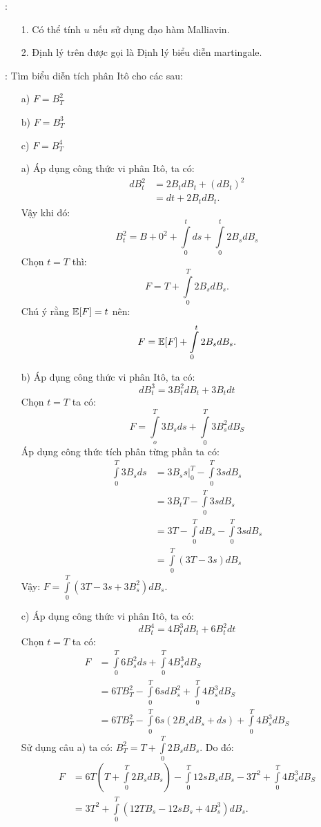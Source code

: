 \remarkname: 
\begin{itemize}
    \item[1.] Có thể tính $u$ nếu sử dụng đạo hàm Malliavin.
    \item[2.] Định lý trên được gọi là Định lý biểu diễn martingale. 
\end{itemize}
\examplename: Tìm biểu diễn tích phân Itô cho các \bnn sau:
\begin{itemize}
    \item[a)] $F =B_T^2$
    \item[b)] $F  = B_T^3$
    \item[c)] $F = B_T^4$ 
\end{itemize}
\begin{sol*}
    \begin{itemize}
        \item[a)] Áp dụng công thức vi phân Itô, ta có:
        \begin{align*}
            dB_t^2 &= 2B_t dB_t + (dB_t)^2 \\
            &= dt + 2B_t dB_t.
        \end{align*}
        Vậy khi đó: 
        \[B_t^2 = B+0^2 + \int\limits_0^t ds+ \int\limits_0^t 2B_s dB_s\]
        Chọn $t=T$ thì: \[F = T + \int\limits_0^T 2B_s dB_s.\]
        Chú ý rằng $\mathbb{E}[F] = t$ nên: \[F = \mathbb{E}[F]+ \int\limits_0^t 2B_s dB_s.\]
        \item[b)]  Áp dụng công thức vi phân Itô, ta có:
        \[dB_t^3 = 3B_t^2 dB_t +3B_t dt\]
        Chọn $t=T$ ta có:
        \[F = \int\limits_o^T 3B_s ds + \int\limits_0^T 3B_s^2 dB_S\]
        Áp dụng công thức tích phân từng phần ta có:
        \begin{align*}
            \int\limits_0^T 3B_s ds &= 3B_s s \Big|_0^T - \int\limits_0^T 3s dB_s\\
            &= 3B_t T - \int\limits_0^T 3s dB_s \\
            &= 3T - \int\limits_0^T dB_s -\int\limits_0^T 3s dB_s\\
            &= \int\limits_0^T (3T-3s) dB_s
        \end{align*}
        Vậy: $F = \int\limits_0^T (3T-3s+3B_s^2) dB_s$.
        \item[c)] Áp dụng công thức vi phân Itô, ta có:
        \[dB_t^4 = 4B_t^3 dB_t +6B_t^2 dt\]
        Chọn $t=T$ ta có:
        \begin{align*}
            F &= \int\limits_0^T 6B_s^2 ds+ \int\limits_0^T 4B_s^3 dB_S\\
            &= 6TB_T^2 - \int\limits_0^T 6s dB_s^2 + \int\limits_0^T 4B_s^3 dB_S\\
            &= 6TB_T^2 - \int\limits_0^T 6s(2B_sdB_s+ds) + \int\limits_0^T 4B_s^3 dB_S            
        \end{align*}
       Sử dụng câu a) ta có: $B_T^2 = T + \int\limits_0^T 2B_s dB_s$. Do đó:
       \begin{align*}
           F &= 6T\left(T + \int\limits_0^T 2B_s dB_s\right) - \int\limits_0^T 12sB_s dB_s - 3T^2 + \int\limits_0^T 4B_s^3 dB_S \\
           &= 3T^2 + \int\limits_0^T (12TB_s -12sB_s+4B_s^3) dB_s.
       \end{align*}
      
    \end{itemize} 
\end{sol*}